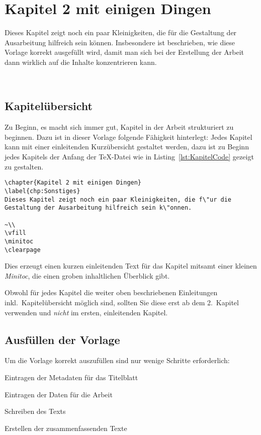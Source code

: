 \chapter{Kapitel 2 mit einigen Dingen}
\label{chp:Sonstiges}
Dieses Kapitel zeigt noch ein paar Kleinigkeiten, die f\"ur die Gestaltung der Ausarbeitung hilfreich sein k\"onnen. Insbesondere ist beschrieben, wie diese Vorlage korrekt ausgef\"ullt wird, damit man sich bei der Erstellung der Arbeit dann wirklich auf die Inhalte konzentrieren kann.

~\\
\vfill
\minitoc
\clearpage


\section{Kapitel\"ubersicht}
\label{sec:2:KapitelUebersicht}
Zu Beginn, es macht sich immer gut, Kapitel in der Arbeit strukturiert zu beginnen. Dazu ist in dieser Vorlage folgende F\"ahigkeit hinterlegt: Jedes Kapitel kann mit einer einleitenden Kurz\"ubersicht gestaltet werden, dazu ist zu Beginn jedes Kapitels der Anfang der \TeX-Datei wie in Listing~\ref{lst:KapitelCode} gezeigt zu gestalten.

\begin{lstlisting}[captionpos=b, caption=Listing f\"ur den Beginn dieses Kapitels,label=lst:KapitelCode]
\chapter{Kapitel 2 mit einigen Dingen}
\label{chp:Sonstiges}
Dieses Kapitel zeigt noch ein paar Kleinigkeiten, die f\"ur die Gestaltung der Ausarbeitung hilfreich sein k\"onnen.

~\\
\vfill
\minitoc
\clearpage
\end{lstlisting}

Dies erzeugt einen kurzen einleitenden Text f\"ur das Kapitel mitsamt einer kleinen \emph{Minitoc}, die einen groben inhaltlichen \"Uberblick gibt.

\begin{MySugg}
	Obwohl f\"ur jedes Kapitel die weiter oben beschriebenen Einleitungen inkl.\ Kapitel\"ubersicht m\"oglich sind, sollten Sie diese erst ab dem 2.~Kapitel verwenden und \emph{nicht} im ersten, einleitenden Kapitel.
\end{MySugg}

\section{Ausf\"ullen der Vorlage}
\label{sec:2:AusfuellenDerVorlage}
Um die Vorlage korrekt auszuf\"ullen sind nur wenige Schritte erforderlich:
\begin{compactenum}
	\item Eintragen der Metadaten f\"ur das Titelblatt
	\item Eintragen der Daten f\"ur die Arbeit
	\item Schreiben des Texts
	\item Erstellen der zusammenfassenden Texte
\end{compactenum}

